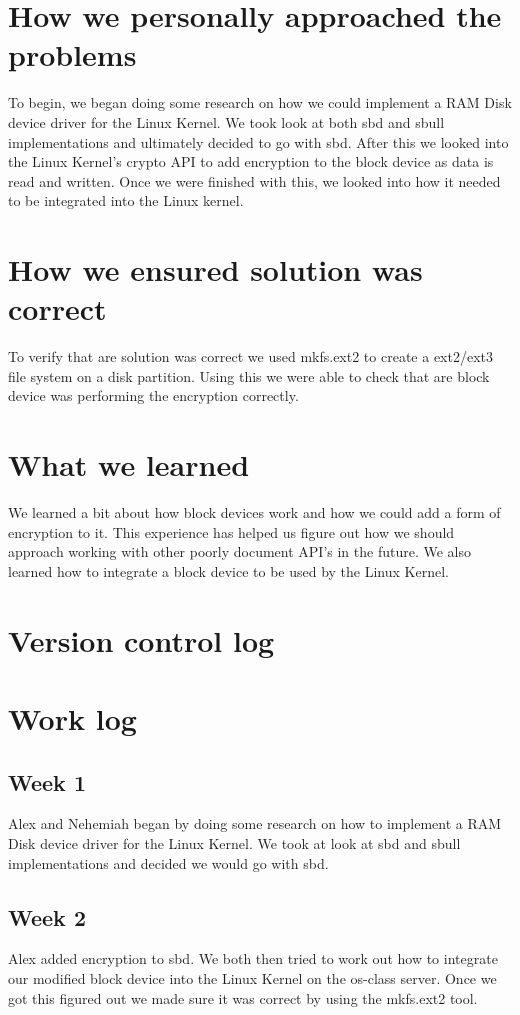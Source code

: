 \documentclass[letterpaper,10pt,titlepage]{article}
\begin{document}
\section{How we personally approached the problems}
To begin, we began doing some research on how we could implement a RAM Disk device driver for the Linux Kernel. We took look at both sbd and sbull implementations and ultimately decided to go with sbd. After this we looked into the Linux Kernel's crypto API to add encryption to the block device as data is read and written. Once we were finished with this, we looked into how it needed to be integrated into the Linux kernel.

\section{How we ensured solution was correct}
To verify that are solution was correct we used mkfs.ext2 to create a ext2/ext3 file system on a disk partition. Using this we were able to check that are block device was performing the encryption correctly.

\section{What we learned}
We learned a bit about how block devices work and how we could add a form of encryption to it. This experience has helped us figure out how we should approach working with other poorly document API's in the future. We also learned how to integrate a block device to be used by the Linux Kernel.

\section{Version control log}


\section{Work log}
\subsection{Week 1}
Alex and Nehemiah began by doing some research on how to implement a RAM Disk device driver for the Linux Kernel. We took at look at sbd and sbull implementations and decided we would go with sbd.
\subsection{Week 2}
Alex added encryption to sbd. We both then tried to work out how to integrate our modified block device into the Linux Kernel on the os-class server. Once we got this figured out we made sure it was correct by using the mkfs.ext2 tool.

%
%
\end{document}
